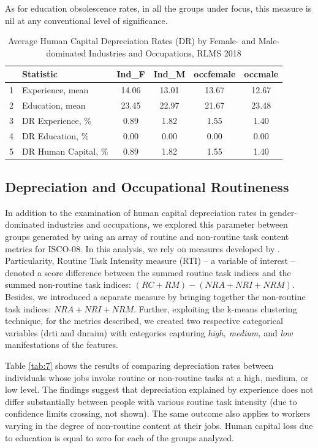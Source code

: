 \documentclass[12pt,a4paper]{article}
\numberwithin{equation}{section}
\begin{document}
As for education obsolescence rates, in all the groups under focus, this measure is nil at any conventional level of significance.

\begin{table}[H]
	\centering 
	\caption{Average Human Capital Depreciation Rates (DR) by Female- and Male-dominated Industries and Occupations, RLMS 2018} 
	\label{tab:6} 
	\begin{tabular}{clcccc}
		\hline
		& \textbf{Statistic} &\textbf{Ind\_F}& \textbf{Ind\_M} & \textbf{occfemale} & \textbf{occmale} \\ 
		\hline
		1 & Experience, mean & 14.06 & 13.01 & 13.67 & 12.67 \\ 
		2 & Education, mean & 23.45 & 22.97 & 21.67 & 23.48 \\ 
		\midrule
		3 & DR Experience, \% & 0.89 & 1.82 & 1.55 & 1.40 \\ 
		4 & DR Education, \% & 0.00 & 0.00 & 0.00 & 0.00 \\ 
		5 & DR Human Capital, \% & 0.89 & 1.82 & 1.55 & 1.40 \\ 
		\hline
	\end{tabular}
\end{table} 


\subsection{Depreciation and Occupational Routineness}

In addition to the examination of human capital depreciation rates in gender-dominated industries and occupations, we explored this parameter between groups generated by using an array of routine and non-routine task content metrics for ISCO-08. In this analysis, we rely on measures developed by \citet{mihaylov_152._2019}. Particularity, Routine Task Intensity measure (RTI) -- a variable of interest -- denoted a score difference between the summed routine task indices and the summed non-routine task indices: $(RC + RM) - (NRA + NRI + NRM)$. Besides, we introduced a separate measure by bringing together the non-routine task indices: $NRA + NRI + NRM$. Further, exploiting the k-means clustering technique, for the metrics described, we created two respective categorical variables (drti and dnraim) with categories capturing \textit{high, medium,} and \textit{low} manifestations of the features.

Table \ref{tab:7} shows the results of comparing depreciation rates between individuals whose jobs invoke routine or non-routine tasks at a high, medium, or low level. The findings suggest that depreciation explained by experience does not differ substantially between people with various routine task intensity (due to confidence limits crossing, not shown). The same outcome also applies to workers varying in the degree of non-routine content at their jobs. Human capital loss due to education is equal to zero for each of the groups analyzed.
\end{document}
